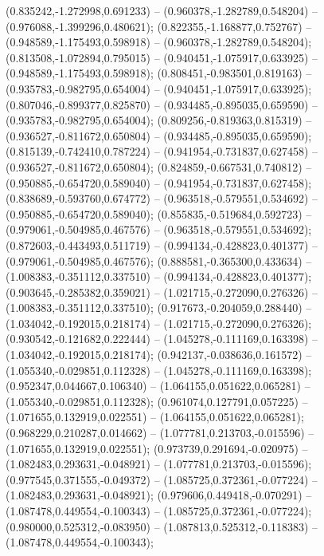  (0.835242,-1.272998,0.691233) -- (0.960378,-1.282789,0.548204) -- (0.976088,-1.399296,0.480621);
 (0.822355,-1.168877,0.752767) -- (0.948589,-1.175493,0.598918) -- (0.960378,-1.282789,0.548204);
 (0.813508,-1.072894,0.795015) -- (0.940451,-1.075917,0.633925) -- (0.948589,-1.175493,0.598918);
 (0.808451,-0.983501,0.819163) -- (0.935783,-0.982795,0.654004) -- (0.940451,-1.075917,0.633925);
 (0.807046,-0.899377,0.825870) -- (0.934485,-0.895035,0.659590) -- (0.935783,-0.982795,0.654004);
 (0.809256,-0.819363,0.815319) -- (0.936527,-0.811672,0.650804) -- (0.934485,-0.895035,0.659590);
 (0.815139,-0.742410,0.787224) -- (0.941954,-0.731837,0.627458) -- (0.936527,-0.811672,0.650804);
 (0.824859,-0.667531,0.740812) -- (0.950885,-0.654720,0.589040) -- (0.941954,-0.731837,0.627458);
 (0.838689,-0.593760,0.674772) -- (0.963518,-0.579551,0.534692) -- (0.950885,-0.654720,0.589040);
 (0.855835,-0.519684,0.592723) -- (0.979061,-0.504985,0.467576) -- (0.963518,-0.579551,0.534692);
 (0.872603,-0.443493,0.511719) -- (0.994134,-0.428823,0.401377) -- (0.979061,-0.504985,0.467576);
 (0.888581,-0.365300,0.433634) -- (1.008383,-0.351112,0.337510) -- (0.994134,-0.428823,0.401377);
 (0.903645,-0.285382,0.359021) -- (1.021715,-0.272090,0.276326) -- (1.008383,-0.351112,0.337510);
 (0.917673,-0.204059,0.288440) -- (1.034042,-0.192015,0.218174) -- (1.021715,-0.272090,0.276326);
 (0.930542,-0.121682,0.222444) -- (1.045278,-0.111169,0.163398) -- (1.034042,-0.192015,0.218174);
 (0.942137,-0.038636,0.161572) -- (1.055340,-0.029851,0.112328) -- (1.045278,-0.111169,0.163398);
 (0.952347,0.044667,0.106340) -- (1.064155,0.051622,0.065281) -- (1.055340,-0.029851,0.112328);
 (0.961074,0.127791,0.057225) -- (1.071655,0.132919,0.022551) -- (1.064155,0.051622,0.065281);
 (0.968229,0.210287,0.014662) -- (1.077781,0.213703,-0.015596) -- (1.071655,0.132919,0.022551);
 (0.973739,0.291694,-0.020975) -- (1.082483,0.293631,-0.048921) -- (1.077781,0.213703,-0.015596);
 (0.977545,0.371555,-0.049372) -- (1.085725,0.372361,-0.077224) -- (1.082483,0.293631,-0.048921);
 (0.979606,0.449418,-0.070291) -- (1.087478,0.449554,-0.100343) -- (1.085725,0.372361,-0.077224);
 (0.980000,0.525312,-0.083950) -- (1.087813,0.525312,-0.118383) -- (1.087478,0.449554,-0.100343);
